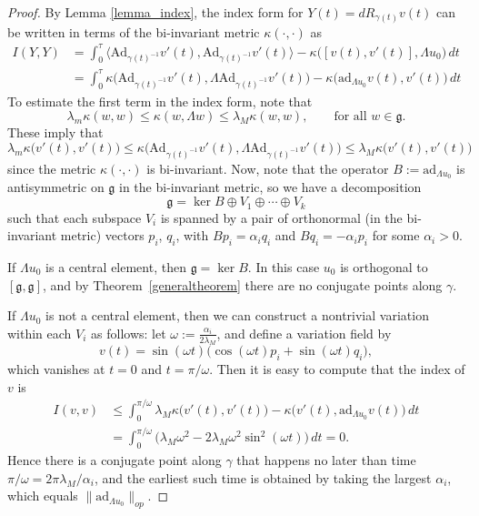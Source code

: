 \documentclass[oneside, 11pt]{amsart}
\numberwithin{equation}{section}
\newcommand{\ad}{\mathrm{ad}}
\newcommand{\Ad}{\mathrm{Ad}}
\newcommand{\bim}{\kappa}
\newcommand{\adlambop}{B}
\begin{document}
\begin{proof}
By Lemma \ref{lemma_index}, the index form for $Y(t)=dR_{\gamma(t)}v(t)$ can be written in terms of the bi-invariant metric $\bim(\cdot, \cdot)$ as
\begin{align*} I(Y,Y) &= 
\int_0^{\tau} \big\langle \Ad_{\gamma(t)^{-1}}v'(t), \Ad_{\gamma(t)^{-1}}v'(t)\big\rangle-\bim\big([v(t),v'(t)],\Lambda u_0\big)\, dt \\
&=\int_0^{\tau} \bim\big(\Ad_{\gamma(t)^{-1}}v'(t),\Lambda \Ad_{\gamma(t)^{-1}}v'(t)\big)-\bim\big(\ad_{\Lambda u_0}v(t),v'(t)\big)\, dt 
\end{align*}
To estimate the first term in the index form, note that  
$$\lambda_m\bim(w, w) \leq \bim(w,\Lambda w) \le \lambda_M \bim(w,w), \qquad \text{for all } w \in \mathfrak{g}.$$
These imply that
    $$ 
    \lambda_m \bim\big( v'(t), v'(t) \big)
    \le
    \bim\big(\Ad_{\gamma(t)^{-1}}v'(t),\Lambda \Ad_{\gamma(t)^{-1}} v'(t))
    \le \lambda_M \bim\big( v'(t), v'(t) \big) $$
    since the metric $\bim(\cdot,\cdot)$ is bi-invariant.  
  Now, note that the operator $\adlambop := \ad_{\Lambda u_0}$ is antisymmetric on $\mathfrak{g}$ in the bi-invariant metric, so we have a decomposition
\begin{equation}\label{eq_g_decomp}
    \mathfrak{g} = \ker \adlambop \oplus V_1 \oplus \cdots \oplus V_k
    \end{equation}
    such that each subspace $V_i$ is spanned by a pair of orthonormal (in the bi-invariant metric) vectors $p_i$, $q_i$, with $\adlambop p_i = \alpha_i q_i$ and $\adlambop q_i = -\alpha_i p_i$ for some $\alpha_i > 0$. 
 

    If $\Lambda u_0$ is a central element, then $\mathfrak{g} = \ker \adlambop$. In this case $u_0$ is orthogonal to $[\mathfrak{g},\mathfrak{g}]$,  
    and by Theorem~\ref{generaltheorem} there are no conjugate points along $\gamma$.

    If $\Lambda u_0$ is not a central element, then we can construct a nontrivial variation within each $V_i$ as follows: let $\omega := \frac{\alpha_i}{2\lambda_M}$, and define a variation field by 
    $$ v(t) = \sin{(\omega t)} \big(\cos{(\omega t)} p_i + \sin{(\omega t)} q_i\big),$$
    which vanishes at $t=0$ and $t=\pi/\omega$. Then it is easy to compute that the index of $v$ is 
    \begin{align*}
        I(v,v) &\le \int_0^{\pi/\omega} \lambda_M \bim\big(v'(t),v'(t)\big) - \bim\big(v'(t),\ad_{\Lambda u_0}v(t)\big) \, dt \\
        &=         \int_0^{\pi/\omega} \big( \lambda_M \omega^2 -  2\lambda_M \omega^2 \sin^2{(\omega t)} \big)\, dt = 0.
    \end{align*}
   Hence there is a conjugate point along $\gamma$ that happens no later than time $\pi/\omega = 2\pi\lambda_M/\alpha_i$, and the earliest such time is obtained by taking the largest $\alpha_i$, which equals $\| \ad_{\Lambda u_0} \|_{op}$.
  

\end{proof}
\end{document}
